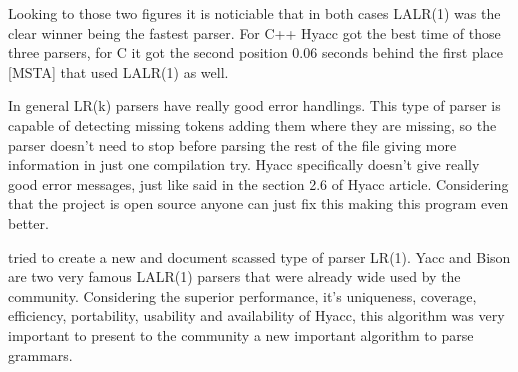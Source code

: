 \documentclass{article}
\begin{document}
    Looking to those two figures it is noticiable that in both cases LALR(1) was the clear winner
    being the fastest parser. For C++ Hyacc got the best time of those three parsers, for C it got the
    second position 0.06 seconds behind the first place [MSTA] that used LALR(1) as well.

    In general LR(k) parsers have really good error handlings. This type of parser is capable of detecting missing tokens
    adding them where they are missing, so the parser doesn't need to stop before parsing the rest of the file
    giving more information in just one compilation try. Hyacc specifically doesn't give really good
    error messages, just like said in the section 2.6 of Hyacc article\cite{hyacc}. Considering that the project
    is open source anyone can just fix this making this program even better.

     tried to create a new and document scassed type of parser LR(1).
    Yacc and Bison are two very famous LALR(1) parsers that were already wide used by the community.
    Considering the superior performance, it's uniqueness, coverage, efficiency, portability,
    usability and availability of Hyacc, this algorithm was very important to present to the community
    a new important algorithm to parse grammars.

    \printbibliography
\end{document}
